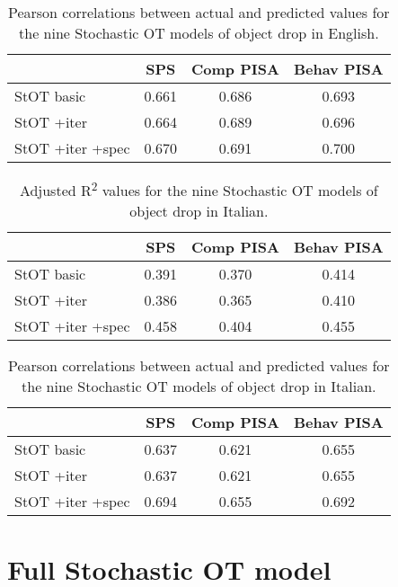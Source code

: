 \begin{table}[htb] %
\caption{Pearson correlations between actual and predicted values for the nine Stochastic OT models of object drop in English.}
\begin{tabular}{l|ccc}
& SPS & Comp PISA & Behav PISA \\
\hline
StOT basic           & 0.661        & 0.686     & 0.693      \\
StOT +iter           & 0.664        & 0.689     & 0.696      \\
StOT +iter +spec     & 0.670        & 0.691     & 0.700     
\end{tabular}
\end{table}

\begin{table}[htb] %
\caption{Adjusted R\textsuperscript{2} values for the nine Stochastic OT models of object drop in Italian.}
\begin{tabular}{l|ccc}
& SPS & Comp PISA & Behav PISA \\
\hline
StOT basic           & 0.391        & 0.370     & 0.414      \\
StOT +iter           & 0.386        & 0.365     & 0.410      \\
StOT +iter +spec     & 0.458        & 0.404     & 0.455     
\end{tabular}
\end{table}

\begin{table}[htb] %
\caption{Pearson correlations between actual and predicted values for the nine Stochastic OT models of object drop in Italian.}
\begin{tabular}{l|ccc}
& SPS & Comp PISA & Behav PISA \\
\hline
StOT basic           & 0.637        & 0.621     & 0.655      \\
StOT +iter           & 0.637        & 0.621     & 0.655      \\
StOT +iter +spec     & 0.694        & 0.655     & 0.692     
\end{tabular}
\end{table}



\section{Full Stochastic OT model} 


